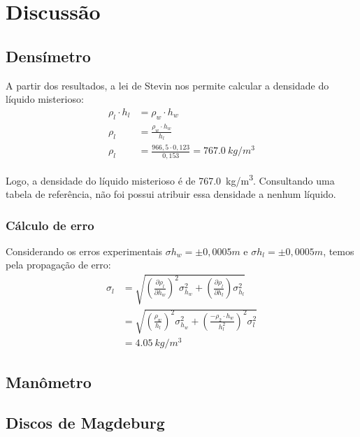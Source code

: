 \section{Discussão}
\subsection{Densímetro}

A partir dos resultados, a lei de Stevin nos permite calcular a densidade do
líquido misterioso:
\begin{align*}
    \rho_l \cdot h_l &= \rho_w \cdot h_w\\
    \rho_l &= \frac{\rho_w \cdot h_w}{h_l}\\
    \rho_l &= \frac{966,5 \cdot 0,123}{0,153} = \qty{767,0}{kg/m^3} 
\end{align*}

Logo, a densidade do líquido misterioso é de \qty{767,0}{kg/m^3}. Consultando
uma tabela de referência, não foi possui atribuir essa densidade a nenhum
líquido.

\subsubsection{Cálculo de erro}
Considerando os erros experimentais \(\sigma h_w = \pm0,0005 m\) e \(\sigma h_l = \pm 0,0005 m\), temos pela propagação de erro:
\begin{align*}
    \sigma_l &= \sqrt{\left(\frac{\partial\rho_l}{\partial h_w}\right)^2\sigma_{h_w}^2 + \left(\frac{\partial\rho_l}{\partial h_l}\right)\sigma_{h_l}^2}\\
    &= \sqrt{\left(\frac{\rho_w}{h_l}\right)^2 \sigma_{h_w}^2 + \left(\frac{-\rho_2 \cdot h_w}{h_l^2}\right)^2\sigma_l^2}\\
    &= \qty{4,05}{kg/m^3}
\end{align*}


\subsection{Manômetro}


\subsection{Discos de Magdeburg}

